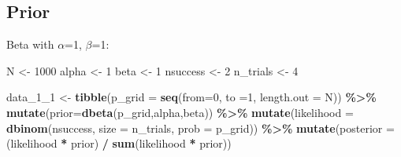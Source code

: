 \documentclass[
]{book}
\newenvironment{Shaded}{\begin{snugshade}}{\end{snugshade}}
\newcommand{\DataTypeTok}[1]{\textcolor[rgb]{0.13,0.29,0.53}{#1}}
\newcommand{\DecValTok}[1]{\textcolor[rgb]{0.00,0.00,0.81}{#1}}
\newcommand{\KeywordTok}[1]{\textcolor[rgb]{0.13,0.29,0.53}{\textbf{#1}}}
\newcommand{\NormalTok}[1]{#1}
\newcommand{\OperatorTok}[1]{\textcolor[rgb]{0.81,0.36,0.00}{\textbf{#1}}}
\newcommand{\StringTok}[1]{\textcolor[rgb]{0.31,0.60,0.02}{#1}}
\begin{document}
\hypertarget{prior-1}{%
\subsection{Prior}\label{prior-1}}

Beta with \(\alpha\)=1, \(\beta\)=1:

\begin{Shaded}
\begin{Highlighting}[]
\NormalTok{N \textless{}{-}}\StringTok{ }\DecValTok{1000}
\NormalTok{alpha \textless{}{-}}\StringTok{ }\DecValTok{1}
\NormalTok{beta \textless{}{-}}\StringTok{ }\DecValTok{1}
\NormalTok{nsuccess \textless{}{-}}\StringTok{ }\DecValTok{2}
\NormalTok{n\_trials \textless{}{-}}\StringTok{ }\DecValTok{4}

\NormalTok{data\_}\DecValTok{1}\NormalTok{\_}\DecValTok{1}\NormalTok{ \textless{}{-}}\StringTok{ }\KeywordTok{tibble}\NormalTok{(}\DataTypeTok{p\_grid =} \KeywordTok{seq}\NormalTok{(}\DataTypeTok{from=}\DecValTok{0}\NormalTok{, }\DataTypeTok{to =}\DecValTok{1}\NormalTok{, }\DataTypeTok{length.out =}\NormalTok{ N)) }\OperatorTok{\%\textgreater{}\%}\StringTok{ }
\StringTok{  }\KeywordTok{mutate}\NormalTok{(}\DataTypeTok{prior=}\KeywordTok{dbeta}\NormalTok{(p\_grid,alpha,beta)) }\OperatorTok{\%\textgreater{}\%}\StringTok{ }
\StringTok{  }\KeywordTok{mutate}\NormalTok{(}\DataTypeTok{likelihood =} \KeywordTok{dbinom}\NormalTok{(nsuccess, }\DataTypeTok{size =}\NormalTok{ n\_trials, }\DataTypeTok{prob =}\NormalTok{ p\_grid)) }\OperatorTok{\%\textgreater{}\%}\StringTok{ }
\StringTok{  }\KeywordTok{mutate}\NormalTok{(}\DataTypeTok{posterior =}\NormalTok{ (likelihood }\OperatorTok{*}\StringTok{ }\NormalTok{prior) }\OperatorTok{/}\StringTok{ }\KeywordTok{sum}\NormalTok{(likelihood }\OperatorTok{*}\StringTok{ }\NormalTok{prior))}
\end{Highlighting}
\end{Shaded}
\end{document}
